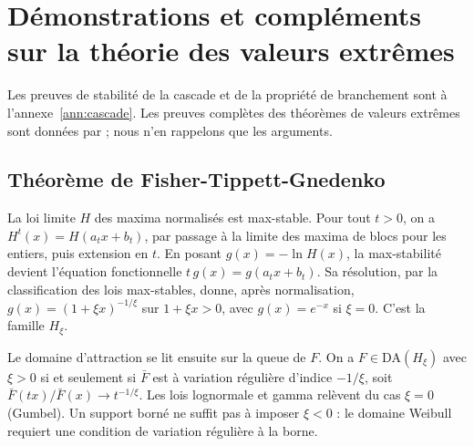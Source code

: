 
\chapter{Démonstrations et compléments sur la théorie des valeurs extrêmes}
\label{ann:evt}

Les preuves de stabilité de la cascade et de la propriété de branchement sont à l'annexe~\ref{ann:cascade}.
Les preuves complètes des théorèmes de valeurs extrêmes sont données par \citet{Embrechts1997} ;
nous n'en rappelons que les arguments.

\section{Théorème de Fisher-Tippett-Gnedenko}
\label{soc:ann:ftg}

La loi limite $H$ des maxima normalisés est max-stable. Pour tout $t>0$, on a $H^t(x)=H(a_tx+b_t)$,
par passage à la limite des maxima de blocs pour les entiers, puis extension en $t$. En posant
$g(x)=-\ln H(x)$, la max-stabilité devient l'équation fonctionnelle $t\,g(x)=g(a_tx+b_t)$. Sa résolution,
par la classification des lois max-stables, donne, après normalisation, $g(x)=(1+\xi x)^{-1/\xi}$
sur $1+\xi x>0$, avec $g(x)=e^{-x}$ si $\xi=0$. C'est la famille $H_\xi$.

Le domaine d'attraction se lit ensuite sur la queue de $F$. On a $F\in\mathrm{DA}(H_\xi)$ avec $\xi>0$ si et
seulement si $\bar F$ est à variation régulière d'indice $-1/\xi$, soit $\bar F(tx)/\bar F(x)\to t^{-1/\xi}$.
Les lois lognormale et gamma relèvent du cas $\xi=0$ (Gumbel). Un support borné ne suffit pas à
imposer $\xi<0$ : le domaine Weibull requiert une condition de variation régulière à la borne.

